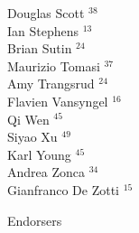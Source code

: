 \documentclass[PICOReport.tex]{subfiles}
\begin{document}
{\begin{multicols}{4}
Douglas Scott $^{38}$                   \\
Ian Stephens $^{13}$                    \\
Brian Sutin $^{24}$                     \\
Maurizio Tomasi $^{37}$                 \\
Amy Trangsrud $^{24}$                   \\
Flavien Vansyngel $^{16}$               \\
Qi Wen $^{45}$                          \\
Siyao Xu $^{49}$                        \\
Karl Young $^{45}$                      \\
Andrea Zonca $^{34}$                    \\
Gianfranco De Zotti $^{15}$             
\end{multicols}
}

\Large { \centerline {Endorsers}}
\end{document}
